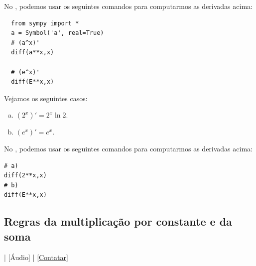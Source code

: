 \ifispython
No \sympy, podemos usar os seguintes comandos para computarmos as derivadas acima:
\begin{lstlisting}
  from sympy import *
  a = Symbol('a', real=True)
  # (a^x)'
  diff(a**x,x)
  
  # (e^x)'
  diff(E**x,x)
\end{lstlisting}
\fi


\begin{ex}
Vejamos os seguintes casos:
\begin{enumerate}[a)]
\item $(2^x)' = 2^x\ln 2$.
\item $(e^x)' = e^x$.
\end{enumerate}

\ifispython
No \sympy, podemos usar os seguintes comandos para computarmos as derivadas acima:
\begin{verbatim}
# a)
diff(2**x,x)
# b)
diff(E**x,x)
\end{verbatim}
\fi
\end{ex}

\subsection{Regras da multiplicação por constante e da soma}\label{subsec:deriv_rmcs}

\begin{flushright}
  [Vídeo] | [Áudio] | \href{https://phkonzen.github.io/notas/contato.html}{[Contatar]}
\end{flushright}

